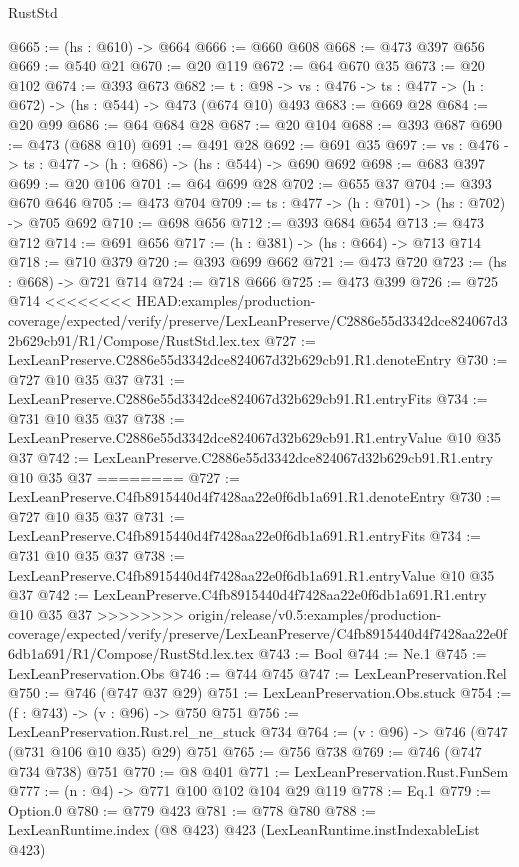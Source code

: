 \begin{lexlean}{RustStd}
\begin{coremodule}
{\begin{coremodule}
@665 := (hs : @610) -> @664
@666 := @660 @608
@668 := @473 @397 @656
@669 := @540 @21
@670 := @20 @119
@672 := @64 @670 @35
@673 := @20 @102
@674 := @393 @673
@682 := {t : @98} -> {vs : @476} -> {ts : @477} -> (h : @672) -> (hs : @544) -> @473 (@674 @10) @493
@683 := @669 @28
@684 := @20 @99
@686 := @64 @684 @28
@687 := @20 @104
@688 := @393 @687
@690 := @473 (@688 @10)
@691 := @491 @28
@692 := @691 @35
@697 := {vs : @476} -> {ts : @477} -> (h : @686) -> (hs : @544) -> @690 @692
@698 := @683 @397
@699 := @20 @106
@701 := @64 @699 @28
@702 := @655 @37
@704 := @393 @670 @646
@705 := @473 @704
@709 := {ts : @477} -> (h : @701) -> (hs : @702) -> @705 @692
@710 := @698 @656
@712 := @393 @684 @654
@713 := @473 @712
@714 := @691 @656
@717 := (h : @381) -> (hs : @664) -> @713 @714
@718 := @710 @379
@720 := @393 @699 @662
@721 := @473 @720
@723 := (hs : @668) -> @721 @714
@724 := @718 @666
@725 := @473 @399
@726 := @725 @714
<<<<<<<< HEAD:examples/production-coverage/expected/verify/preserve/LexLeanPreserve/C2886e55d3342dce824067d32b629cb91/R1/Compose/RustStd.lex.tex
@727 := LexLeanPreserve.C2886e55d3342dce824067d32b629cb91.R1.denoteEntry
@730 := @727 @10 @35 @37
@731 := LexLeanPreserve.C2886e55d3342dce824067d32b629cb91.R1.entryFits
@734 := @731 @10 @35 @37
@738 := LexLeanPreserve.C2886e55d3342dce824067d32b629cb91.R1.entryValue @10 @35 @37
@742 := LexLeanPreserve.C2886e55d3342dce824067d32b629cb91.R1.entry @10 @35 @37
========
@727 := LexLeanPreserve.C4fb8915440d4f7428aa22e0f6db1a691.R1.denoteEntry
@730 := @727 @10 @35 @37
@731 := LexLeanPreserve.C4fb8915440d4f7428aa22e0f6db1a691.R1.entryFits
@734 := @731 @10 @35 @37
@738 := LexLeanPreserve.C4fb8915440d4f7428aa22e0f6db1a691.R1.entryValue @10 @35 @37
@742 := LexLeanPreserve.C4fb8915440d4f7428aa22e0f6db1a691.R1.entry @10 @35 @37
>>>>>>>> origin/release/v0.5:examples/production-coverage/expected/verify/preserve/LexLeanPreserve/C4fb8915440d4f7428aa22e0f6db1a691/R1/Compose/RustStd.lex.tex
@743 := Bool
@744 := Ne.{1}
@745 := LexLeanPreservation.Obs
@746 := @744 @745
@747 := LexLeanPreservation.Rel
@750 := @746 (@747 @37 @29)
@751 := LexLeanPreservation.Obs.stuck
@754 := (f : @743) -> (v : @96) -> @750 @751
@756 := LexLeanPreservation.Rust.rel_ne_stuck @734
@764 := (v : @96) -> @746 (@747 (@731 @106 @10 @35) @29) @751
@765 := @756 @738
@769 := @746 (@747 @734 @738) @751
@770 := @8 @401
@771 := LexLeanPreservation.Rust.FunSem
@777 := (n : @4) -> @771 @100 @102 @104 @29 @119
@778 := Eq.{1}
@779 := Option.{0}
@780 := @779 @423
@781 := @778 @780
@788 := LexLeanRuntime.index (@8 @423) @423 (LexLeanRuntime.instIndexableList @423)

\end{coremodule}}
\end{coremodule}
\end{lexlean}
